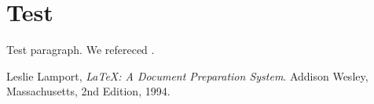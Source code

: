 \documentclass[12pt]{article}
\begin{document}
\section{Test}
Test paragraph. We refereced \cite{lamport94}.

%
%


\begin{thebibliography}{9}

	  Leslie Lamport,
	  \emph{\LaTeX: A Document Preparation System}.
	  Addison Wesley, Massachusetts,
	  2nd Edition,
	  1994.

\end{thebibliography}
\end{document}
